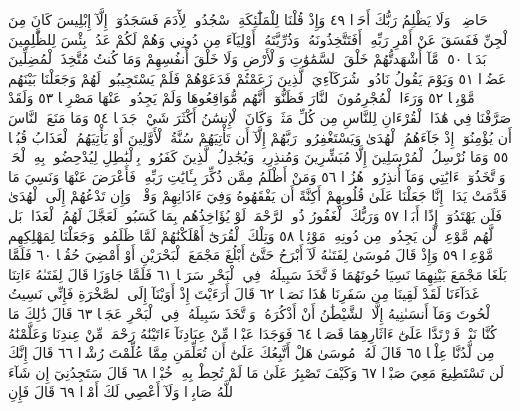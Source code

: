 حَاضِرࣰاۗ وَلَا يَظْلِمُ رَبُّكَ أَحَدࣰا ٤٩ وَإِذْ قُلْنَا لِلْمَلَٰٓئِكَةِ ٱسْجُدُوا۟
لِأٓدَمَ فَسَجَدُوٓا۟ إِلَّآ إِبْلِيسَ كَانَ مِنَ ٱلْجِنِّ فَفَسَقَ عَنْ أَمْرِ رَبِّهِۦٓۗ
أَفَتَتَّخِذُونَهُۥ وَذُرِّيَّتَهُۥٓ أَوْلِيَآءَ مِن دُونِي وَهُمْ لَكُمْ عَدُوُّۢۚ
بِئْسَ لِلظَّٰلِمِينَ بَدَلࣰا ٥٠۞ مَّآ أَشْهَدتُّهُمْ خَلْقَ ٱلسَّمَٰوَٰتِ وَٱلْأَرْضِ
وَلَا خَلْقَ أَنفُسِهِمْ وَمَا كُنتُ مُتَّخِذَ ٱلْمُضِلِّينَ عَضُدࣰا ٥١
وَيَوْمَ يَقُولُ نَادُوا۟ شُرَكَآءِيَ ٱلَّذِينَ زَعَمْتُمْ فَدَعَوْهُمْ
فَلَمْ يَسْتَجِيبُوا۟ لَهُمْ وَجَعَلْنَا بَيْنَهُم مَّوْبِقࣰا ٥٢ وَرَءَا ٱلْمُجْرِمُونَ
ٱلنَّارَ فَظَنُّوٓا۟ أَنَّهُم مُّوَاقِعُوهَا وَلَمْ يَجِدُوا۟ عَنْهَا مَصْرِفࣰا ٥٣
وَلَقَدْ صَرَّفْنَا فِي هَٰذَا ٱلْقُرْءَانِ لِلنَّاسِ مِن كُلِّ مَثَلࣲۚ وَكَانَ
ٱلْإِنسَٰنُ أَكْثَرَ شَيْءࣲ جَدَلࣰا ٥٤ وَمَا مَنَعَ ٱلنَّاسَ أَن يُؤْمِنُوٓا۟
إِذْ جَآءَهُمُ ٱلْهُدَىٰ وَيَسْتَغْفِرُوا۟ رَبَّهُمْ إِلَّآ أَن تَأْتِيَهُمْ سُنَّةُ
ٱلْأَوَّلِينَ أَوْ يَأْتِيَهُمُ ٱلْعَذَابُ قُبُلࣰا ٥٥ وَمَا نُرْسِلُ ٱلْمُرْسَلِينَ
إِلَّا مُبَشِّرِينَ وَمُنذِرِينَۚ وَيُجَٰدِلُ ٱلَّذِينَ كَفَرُوا۟ بِٱلْبَٰطِلِ
لِيُدْحِضُوا۟ بِهِ ٱلْحَقَّۖ وَٱتَّخَذُوٓا۟ ءَايَٰتِي وَمَآ أُنذِرُوا۟ هُزُوࣰا ٥٦
وَمَنْ أَظْلَمُ مِمَّن ذُكِّرَ بِـَٔايَٰتِ رَبِّهِۦ فَأَعْرَضَ عَنْهَا وَنَسِيَ
مَا قَدَّمَتْ يَدَاهُۚ إِنَّا جَعَلْنَا عَلَىٰ قُلُوبِهِمْ أَكِنَّةً أَن يَفْقَهُوهُ
وَفِيٓ ءَاذَانِهِمْ وَقْرࣰاۖ وَإِن تَدْعُهُمْ إِلَى ٱلْهُدَىٰ فَلَن يَهْتَدُوٓا۟ إِذًا
أَبَدࣰا ٥٧ وَرَبُّكَ ٱلْغَفُورُ ذُو ٱلرَّحْمَةِۖ لَوْ يُؤَاخِذُهُم بِمَا كَسَبُوا۟
لَعَجَّلَ لَهُمُ ٱلْعَذَابَۚ بَل لَّهُم مَّوْعِدࣱ لَّن يَجِدُوا۟ مِن دُونِهِۦ
مَوْئِلࣰا ٥٨ وَتِلْكَ ٱلْقُرَىٰٓ أَهْلَكْنَٰهُمْ لَمَّا ظَلَمُوا۟ وَجَعَلْنَا
لِمَهْلِكِهِم مَّوْعِدࣰا ٥٩ وَإِذْ قَالَ مُوسَىٰ لِفَتَىٰهُ لَآ أَبْرَحُ حَتَّىٰٓ
أَبْلُغَ مَجْمَعَ ٱلْبَحْرَيْنِ أَوْ أَمْضِيَ حُقُبࣰا ٦٠ فَلَمَّا بَلَغَا مَجْمَعَ
بَيْنِهِمَا نَسِيَا حُوتَهُمَا فَٱتَّخَذَ سَبِيلَهُۥ فِي ٱلْبَحْرِ سَرَبࣰا ٦١
فَلَمَّا جَاوَزَا قَالَ لِفَتَىٰهُ ءَاتِنَا غَدَآءَنَا لَقَدْ لَقِينَا مِن سَفَرِنَا
هَٰذَا نَصَبࣰا ٦٢ قَالَ أَرَءَيْتَ إِذْ أَوَيْنَآ إِلَى ٱلصَّخْرَةِ فَإِنِّي نَسِيتُ
ٱلْحُوتَ وَمَآ أَنسَىٰنِيهُ إِلَّا ٱلشَّيْطَٰنُ أَنْ أَذْكُرَهُۥۚ وَٱتَّخَذَ سَبِيلَهُۥ
فِي ٱلْبَحْرِ عَجَبࣰا ٦٣ قَالَ ذَٰلِكَ مَا كُنَّا نَبْغِۚ فَٱرْتَدَّا عَلَىٰٓ ءَاثَارِهِمَا
قَصَصࣰا ٦٤ فَوَجَدَا عَبْدࣰا مِّنْ عِبَادِنَآ ءَاتَيْنَٰهُ رَحْمَةࣰ مِّنْ عِندِنَا
وَعَلَّمْنَٰهُ مِن لَّدُنَّا عِلْمࣰا ٦٥ قَالَ لَهُۥ مُوسَىٰ هَلْ أَتَّبِعُكَ عَلَىٰٓ أَن
تُعَلِّمَنِ مِمَّا عُلِّمْتَ رُشْدࣰا ٦٦ قَالَ إِنَّكَ لَن تَسْتَطِيعَ مَعِيَ
صَبْرࣰا ٦٧ وَكَيْفَ تَصْبِرُ عَلَىٰ مَا لَمْ تُحِطْ بِهِۦ خُبْرࣰا ٦٨ قَالَ
سَتَجِدُنِيٓ إِن شَآءَ ٱللَّهُ صَابِرࣰا وَلَآ أَعْصِي لَكَ أَمْرࣰا ٦٩ قَالَ فَإِنِ

